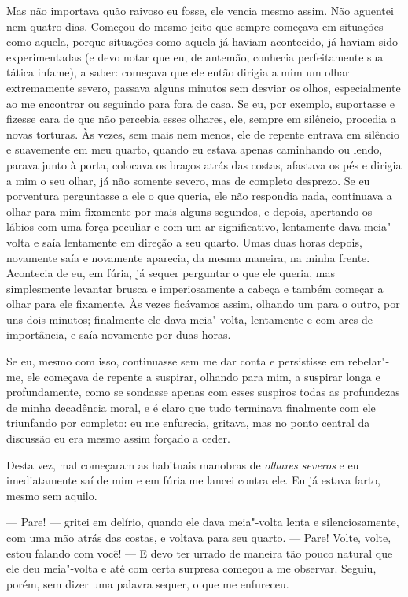 Mas não importava quão raivoso eu fosse, ele vencia mesmo assim. Não
aguentei nem quatro dias. Começou do mesmo jeito que sempre começava em
situações como aquela, porque situações como aquela já haviam
acontecido, já haviam sido experimentadas (e devo notar que eu, de
antemão, conhecia perfeitamente sua tática infame), a saber: começava
que ele então dirigia a mim um olhar extremamente severo, passava
alguns minutos sem desviar os olhos, especialmente ao me encontrar ou
seguindo para fora de casa. Se eu, por exemplo, suportasse e fizesse
cara de que não percebia esses olhares, ele, sempre em silêncio,
procedia a novas torturas. Às vezes, sem mais nem menos, ele de repente
entrava em silêncio e suavemente em meu quarto, quando eu estava apenas
caminhando ou lendo, parava junto à porta, colocava os braços atrás das
costas, afastava os pés e dirigia a mim o seu olhar, já não somente
severo, mas de completo desprezo. Se eu porventura perguntasse a ele o
que queria, ele não respondia nada, continuava a olhar para mim
fixamente por mais alguns segundos, e depois, apertando os lábios com
uma força peculiar e com um ar significativo, lentamente dava
meia"-volta e saía lentamente em direção a seu quarto. Umas duas horas
depois, novamente saía e novamente aparecia, da mesma maneira, na minha
frente. Acontecia de eu, em fúria, já sequer perguntar o que ele
queria, mas simplesmente levantar brusca e imperiosamente a cabeça e
também começar a olhar para ele fixamente. Às vezes ficávamos assim,
olhando um para o outro, por uns dois minutos; finalmente ele dava
meia"-volta, lentamente e com ares de importância, e saía novamente por
duas horas.

Se eu, mesmo com isso, continuasse sem me dar conta e persistisse em
rebelar"-me, ele começava de repente a suspirar, olhando para mim, a
suspirar longa e profundamente, como se sondasse apenas com esses
suspiros todas as profundezas de minha decadência moral, e é claro que
tudo terminava finalmente com ele triunfando por completo: eu me
enfurecia, gritava, mas no ponto central da discussão eu era mesmo
assim forçado a ceder.

Desta vez, mal começaram as habituais manobras de \textit{olhares severos} e eu
imediatamente saí de mim e em fúria me lancei contra ele. Eu já estava
farto, mesmo sem aquilo.

--- Pare! --- gritei em delírio, quando ele dava meia"-volta lenta e
silenciosamente, com uma mão atrás das costas, e voltava para seu
quarto. --- Pare! Volte, volte, estou falando com você! --- E devo ter
urrado de maneira tão pouco natural que ele deu meia"-volta e até com
certa surpresa começou a me observar. Seguiu, porém, sem dizer uma
palavra sequer, o que me enfureceu.

